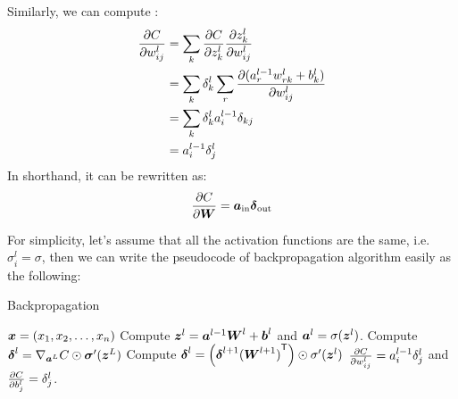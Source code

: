 Similarly, we can compute :
\begin{align*}
    \frac{\partial {C}}{\partial {w^l_{ij}}} &= \sum_k \frac{\partial {C}}{\partial {z^l_k}} \frac{\partial {z^l_k}}{\partial {w^l_{ij}}}\\
                        &= \sum_k \delta^l_k \sum_r \frac{\partial {(a^{l-1}_r w^l_{rk} + b^l_k)}}{\partial {w^l_{ij}}}\\
                        &= \sum_k \delta^l_k a^{l-1}_i \delta_{kj}\\
                        &= a^{l-1}_i \delta^l_j
\end{align*}
In shorthand, it can be rewritten as:
\begin{equation}
    \frac{\partial {C}}{\partial {\ensuremath{\boldsymbol{W}}}} = \boldsymbol{a}_{\text{in}}\boldsymbol{\delta}_{\text{out}}
\end{equation}

For simplicity, let's assume that all the activation functions are the same, i.e. $\sigma^l_i = \sigma$, then 
we can write the pseudocode of backpropagation algorithm easily as the following:

\begin{algorithm}
    \caption{Backpropagation}\label{backpropagation}
    \begin{algorithmic}[1]
        \Require $\boldsymbol{x} = (x_1, x_2, \ldots, x_n)$
            \State Compute $\boldsymbol{z}^l = \boldsymbol{a}^{l-1} \boldsymbol{W}^l + \boldsymbol{b}^l$ and $\boldsymbol{a}^l = \sigma(\boldsymbol{z}^l)$.
        \EndFor
        \State Compute $\boldsymbol{\delta}^l = \nabla_{\boldsymbol{a}^L}C \odot \boldsymbol{\sigma}'(\boldsymbol{z}^L)$
            \State Compute $\boldsymbol{\delta}^l = \left(\boldsymbol{\delta}^{l+1} {(\boldsymbol{W}^{l+1})}^\mathsf{T}\right) \odot \sigma'(\boldsymbol{z}^l)$
        \EndFor
        \Ensure $\frac{\partial {C}}{\partial {w^l_{ij}}} = a^{l-1}_i \delta^l_j$ and $\frac{\partial {C}}{\partial {b^l_j}} = \delta^l_j$.
    \end{algorithmic}
\end{algorithm}

